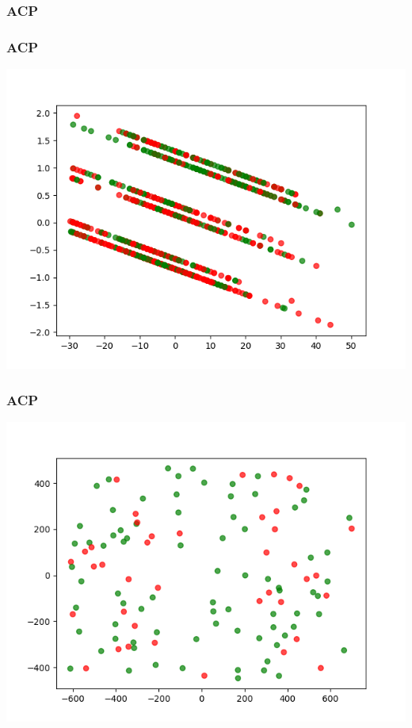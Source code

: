 \documentclass[11pt]{beamer}
\newenvironment{slide}[1]{%
\begin{frame}[environment=slide]
\frametitle{#1}
}{%
\end{frame}
}
\newcommand{\Python}[1]{
	{\small	}
}
\begin{document}
\begin{slide}{ACP}
\begin{center}
\Python{acp}
\end{center}
\end{slide}

\begin{slide}{ACP}
\begin{center}
\includegraphics[scale=0.4]{titanic_acp}
\end{center}
\end{slide}

\begin{slide}{ACP}
\begin{center}
\includegraphics[scale=0.4]{titanic_acp_mv}
\end{center}
\end{slide}
\end{document}
